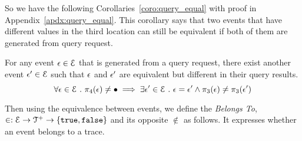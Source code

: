 {{So we have the following Corollaries~\ref{coro:query_equal} with proof in Appendix~\ref{apdx:query_equal}.
This corollary says that two events that have different values 
in the third location can still be equivalent if both of them are generated from query request.
\begin{coro}
 \label{coro:query_equal}
 For any event $\mathtt{\epsilon} \in \mathcal{E}$ that is generated from a query request, 
 there exist another event $\mathtt{\epsilon}' \in \mathcal{E}$ 
 such that 
 $\mathtt{\epsilon}$ and $\mathtt{\epsilon}'$ are equivalent but different in their query results.
 \[
 \forall \mathtt{\epsilon} \in \mathcal{E} ~.~ 
 \pi_4(\mathtt{\epsilon}) \neq \bullet
 \implies \exists 
 \mathtt{\epsilon}' \in \mathcal{E} ~.~ 
 \mathtt{\epsilon} = \mathtt{\epsilon}' \land \pi_3(\mathtt{\epsilon}) \neq \pi_3(\mathtt{\epsilon}')
 \]
 \end{coro}

 


Then using the equivalence between events, we
define the \emph{Belongs To}, 
 $\in : \mathcal{E} \to \mathcal{T}^{+} \to \{\mathtt{true}, \mathtt{false} \} $
 and its opposite $\not\in$ as follows.
It expresses whether an event belongs to a trace.

}}
